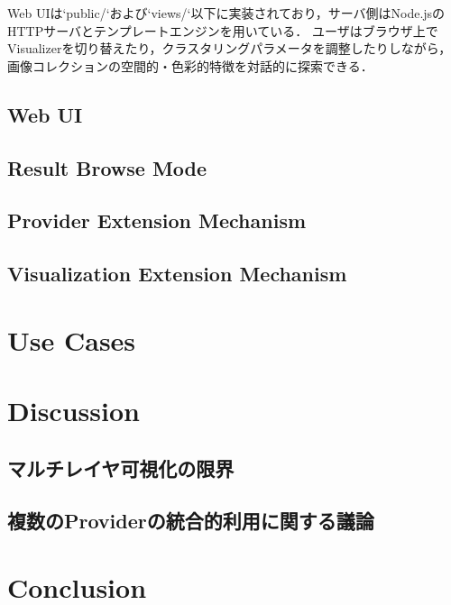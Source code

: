 Web UIは`public/`および`views/`以下に実装されており，サーバ側はNode.jsのHTTPサーバとテンプレートエンジンを用いている．
ユーザはブラウザ上でVisualizerを切り替えたり，クラスタリングパラメータを調整したりしながら，画像コレクションの空間的・色彩的特徴を対話的に探索できる．

\subsection{Web UI}
\label{sec:webui}

\subsection{Result Browse Mode}
\label{sec:resultbrowse}

\subsection{Provider Extension Mechanism}
\label{sec:providerextension}
\subsection{Visualization Extension Mechanism}
\label{sec:visualizationextension}


\section{Use Cases}
\label{sec:usecases}

\section{Discussion}
\label{sec:discussion}

\subsection{マルチレイヤ可視化の限界}

\subsection{複数のProviderの統合的利用に関する議論}


\section{Conclusion}
\label{sec:conclusion}



